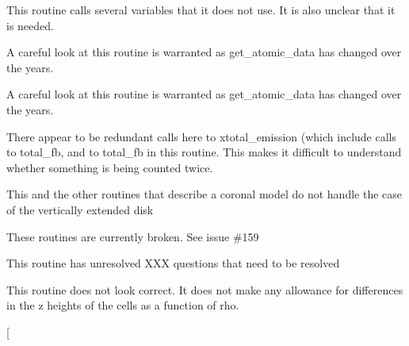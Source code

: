 \begin{DoxyRefList}
\item[\label{bug__bug000004}%
\Hypertarget{bug__bug000004}%
Global \hyperlink{templates_8h_a11871d7df7f3167db92bef8c8ef98926}{check\+\_\+fmax} (double fmin, double fmax, double temp)]This routine calls several variables that it does not use. It is also unclear that it is needed. 
\item[\label{bug__bug000030}%
\Hypertarget{bug__bug000030}%
Global \hyperlink{templates_8h_afa8b5c03286c90c5365b874967e81b33}{check\+\_\+xsections} (void)]A careful look at this routine is warranted as get\+\_\+atomic\+\_\+data has changed over the years. 
\item[\label{bug__bug000030}%
\Hypertarget{bug__bug000030}%
Global \hyperlink{templates_8h_afa8b5c03286c90c5365b874967e81b33}{check\+\_\+xsections} (void)]A careful look at this routine is warranted as get\+\_\+atomic\+\_\+data has changed over the years. 
\item[\label{bug__bug000009}%
\Hypertarget{bug__bug000009}%
Global \hyperlink{templates_8h_abf7699b950ec2ef55a4e0087d82d0ab3}{cooling} (Plasma\+Ptr xxxplasma, double t)]There appear to be redundant calls here to xtotal\+\_\+emission (which include calls to total\+\_\+fb, and to total\+\_\+fb in this routine. This makes it difficult to understand whether something is being counted twice. 
\item[\label{bug__bug000012}%
\Hypertarget{bug__bug000012}%
Global \hyperlink{corona_8c_a547bb990f8958165c0c4382393910d37}{corona\+\_\+rho} (ndom, x)]This and the other routines that describe a coronal model do not handle the case of the vertically extended disk 
\item[\label{bug__bug000013}%
\Hypertarget{bug__bug000013}%
File \hyperlink{cylind__var_8c}{cylind\+\_\+var.c} ]These routines are currently broken. See issue \#159  
\item[\label{bug__bug000015}%
\Hypertarget{bug__bug000015}%
Global \hyperlink{templates_8h_a13144d35b1d57cfa570b6e59d225f474}{cylind\+\_\+volumes} (int ndom, Wind\+Ptr w)]This routine has unresolved X\+XX questions that need to be resolved 
\item[\label{bug__bug000014}%
\Hypertarget{bug__bug000014}%
Global \hyperlink{cylind__var_8c_a3185dc024d7c8bf77fe0be0dc128a272}{cylvar\+\_\+coord\+\_\+fraction} (int ndom, int ichoice, x, ii, frac, int $\ast$nelem)]This routine does not look correct. It does not make any allowance for differences in the z heights of the cells as a function of rho. 
\item[\label{bug__bug000043}%
%

\end{DoxyRefList}
